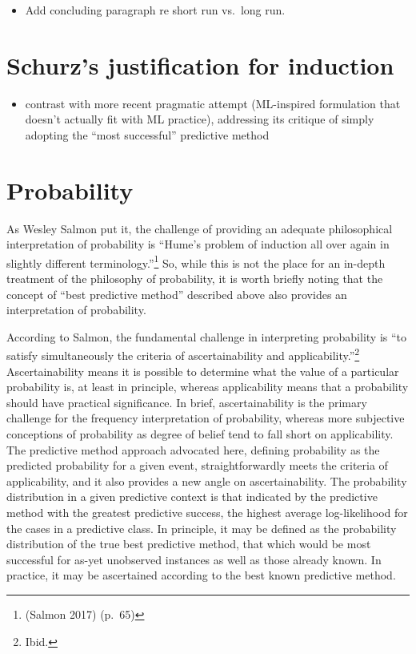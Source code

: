 \documentclass[
  letterpaper,
  DIV=11,
  numbers=noendperiod]{scrartcl}
\providecommand{\tightlist}{%
  \setlength{\itemsep}{0pt}\setlength{\parskip}{0pt}}
\theoremstyle{definition}
\theoremstyle{remark}
\begin{document}
\begin{itemize}
\tightlist
\item
  Add concluding paragraph re short run vs.~long run.
\end{itemize}

\section{Schurz's justification for induction}\label{sec-schurz}

\begin{itemize}
\tightlist
\item
  contrast with more recent pragmatic attempt (ML-inspired formulation
  that doesn't actually fit with ML practice), addressing its critique
  of simply adopting the ``most successful'' predictive method
\end{itemize}

\section{Probability}\label{sec-intprob}

As Wesley Salmon put it, the challenge of providing an adequate
philosophical interpretation of probability is ``Hume's problem of
induction all over again in slightly different terminology.''\footnote{(Salmon
  2017) (p.~65)} So, while this is not the place for an in-depth
treatment of the philosophy of probability, it is worth briefly noting
that the concept of ``best predictive method'' described above also
provides an interpretation of probability.

According to Salmon, the fundamental challenge in interpreting
probability is ``to satisfy simultaneously the criteria of
ascertainability and applicability.''\footnote{Ibid.} Ascertainability
means it is possible to determine what the value of a particular
probability is, at least in principle, whereas applicability means that
a probability should have practical significance. In brief,
ascertainability is the primary challenge for the frequency
interpretation of probability, whereas more subjective conceptions of
probability as degree of belief tend to fall short on applicability. The
predictive method approach advocated here, defining probability as the
predicted probability for a given event, straightforwardly meets the
criteria of applicability, and it also provides a new angle on
ascertainability. The probability distribution in a given predictive
context is that indicated by the predictive method with the greatest
predictive success, the highest average log-likelihood for the cases in
a predictive class. In principle, it may be defined as the probability
distribution of the true best predictive method, that which would be
most successful for as-yet unobserved instances as well as those already
known. In practice, it may be ascertained according to the best known
predictive method.
\end{document}
